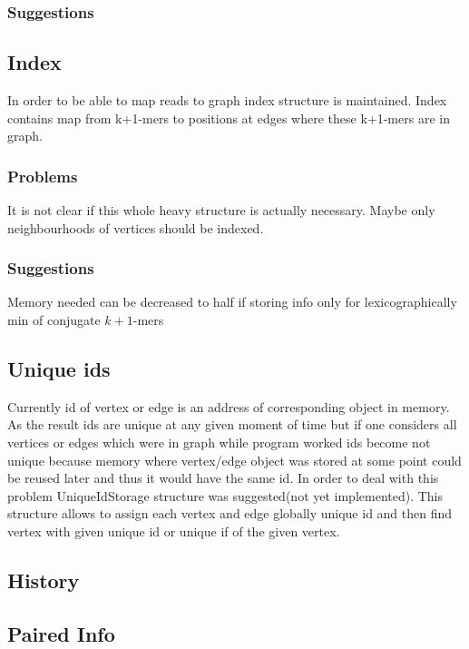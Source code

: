 \documentclass[12pt]{article}
\begin{document}
\subsubsection{Suggestions}

\subsection{Index}

In order to be able to map reads to graph index structure is maintained. Index contains map from k+1-mers to positions at edges where these k+1-mers are in graph.

\subsubsection{Problems}

It is not clear if this whole heavy structure is actually necessary. Maybe only neighbourhoods of vertices should be indexed.


\subsubsection{Suggestions}
Memory needed can be decreased to half if storing info only for lexicographically min of conjugate $k+1$-mers

\subsection{Unique ids}

Currently id of vertex or edge is an address of corresponding object in memory. As the result ids are unique at any given moment of time but if one considers all vertices or edges which were in graph while program worked ids become not unique because memory where vertex/edge object was stored at some point could be reused later and thus it would have the same id. In order to deal with this problem UniqueIdStorage structure was suggested(not yet implemented). This structure allows to assign each vertex and edge globally unique id and then find vertex with given unique id or unique if of the given vertex.

\subsection{History}

\subsection{Paired Info}
\end{document}
